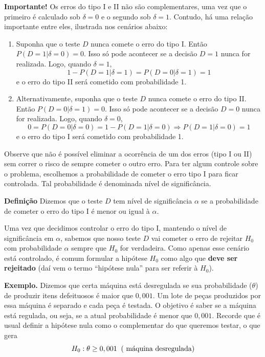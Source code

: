 \documentclass[
  letterpaper,
  DIV=11,
  numbers=noendperiod]{scrartcl}
\begin{document}
\textbf{Importante!} Os erros do tipo I e II não são complementares, uma
vez que o primeiro é calculado sob \(\delta=0\) e o segundo sob
\(\delta=1\). Contudo, há uma relação importante entre eles, ilustrada
nos cenários abaixo:

\begin{enumerate}
\def\labelenumi{\arabic{enumi}.}
\item
  Suponha que o teste \(D\) nunca comete o erro do tipo I. Então
  \(P(D=1|\delta=0)=0\). Isso só pode acontecer se a decisão \(D=1\)
  nunca for realizada. Logo, quando \(\delta=1\),
  \[1-P(D=1|\delta=1)=P(D=0|\delta=1)=1\] e o erro do tipo II será
  cometido com probabilidade 1.
\item
  Alternativamente, suponha que o teste \(D\) nunca comete o erro do
  tipo II. Então \(P(D=0|\delta=1)=0\). Isso só pode acontecer se a
  decisão \(D=0\) nunca for realizada. Logo, quando \(\delta=0\),
  \[0=P(D=0|\delta=0)=1-P(D=1|\delta=0)\Rightarrow P(D=1|\delta=0)=1\] e
  o erro do tipo I será cometido com probabilidade 1.
\end{enumerate}

Observe que não é possível eliminar a ocorrência de um dos erros (tipo I
ou II) sem correr o risco de sempre cometer o outro erro. Para ter algum
controle sobre o problema, escolhemos a probabilidade de cometer o erro
tipo I para ficar controlada. Tal probabilidade é denominada nível de
significância.

\textbf{Definição} Dizemos que o teste \(D\) tem nível de significância
\(\alpha\) se a probabilidade de cometer o erro do tipo I é menor ou
igual à \(\alpha\).

Uma vez que decidimos controlar o erro do tipo I, mantendo o nível de
significância em \(\alpha\), sabemos que nosso teste \(D\) vai cometer o
erro de rejeitar \(H_0\) com probabilidade \(\alpha\) sempre que \(H_0\)
for verdadeira. Como apenas esse cenário está controlado, é comum
formular a hipótese \(H_0\) como algo que \textbf{deve ser rejeitado}
(daí vem o termo ``hipótese nula'' para ser referir à \(H_0\)).

\textbf{Exemplo.} Dizemos que certa máquina está desregulada se sua
probabilidade (\(\theta\)) de produzir itens defeituosos é maior que
\(0,001\). Um lote de peças produzidos por essa máquina é separado e
cada peça é testada. O objetivo é saber se a máquina está regulada, ou
seja, se a atual probabilidade é menor que \(0,001\). Recorde que é
usual definir a hipótese nula como o complementar do que queremos
testar, o que gera
\[H_0:\theta\geq 0,001\;\; (\hbox{ máquina desregulada})\]
\end{document}
